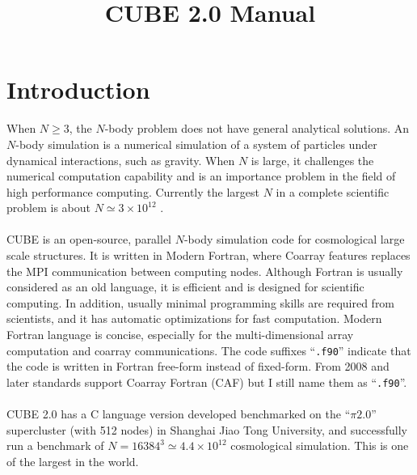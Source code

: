 \documentclass[12pt]{article}
\date{} %
\begin{document}
\title{CUBE 2.0 Manual}


\maketitle




\tableofcontents

\section{Introduction}

When $N\geq 3$, the $N$-body problem does not have general analytical solutions. An $N$-body simulation is a numerical simulation of a system of particles under dynamical interactions, such as gravity. When $N$ is large, it challenges the numerical computation capability and is an importance problem in the field of high performance computing. Currently the largest $N$ in a complete scientific problem is about $N\simeq 3\times 10^{12}$ \cite{2017NatAs...1E.143Y}.
\\\\
CUBE is an open-source, parallel $N$-body simulation code for cosmological large scale structures. It is written in Modern Fortran, where Coarray features replaces the MPI communication between computing nodes. 
Although Fortran is usually considered as an old language, it is efficient and is designed for scientific computing. In addition, usually minimal programming skills are required from scientists, and it has automatic optimizations for fast computation. Modern Fortran language is concise, especially for the multi-dimensional array computation and coarray communications. The code suffixes ``{\tt *.f90}'' indicate that the code is written in Fortran free-form instead of fixed-form. From 2008 and later standards support Coarray Fortran (CAF) but I still name them as ``{\tt *.f90}''.
\\\\
CUBE 2.0 has a C language version developed benchmarked on the ``$\pi2.0$'' supercluster (with 512 nodes) in Shanghai Jiao Tong University, and successfully run a benchmark of $N=16384^3\simeq 4.4\times 10^{12}$ cosmological simulation. This is one of the largest in the world.
\\\\
\end{document}

